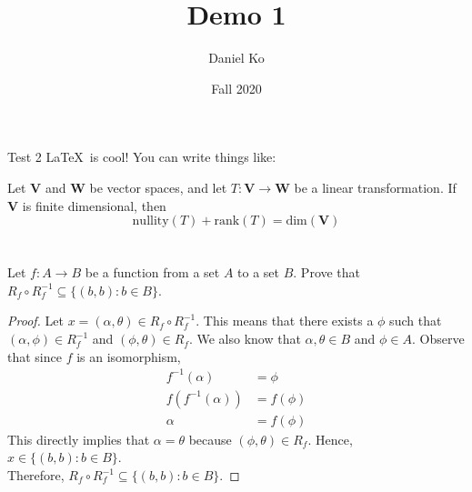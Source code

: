\documentclass[11pt]{scrartcl}
\title{Demo 1}
\author{Daniel Ko}
\date{Fall 2020}
\begin{document}
\maketitle

\section{}
Test 2
\LaTeX \ is cool! You can write things like:
\begin{theorem*}
	Let \textbf{V} and \textbf{W} be vector spaces, and let 
	$T: \mathbf{V} \rightarrow \mathbf{W}$ be a linear transformation.
	If $\mathbf{V}$ is finite dimensional, then
	$$\text{nullity}(T) + \text{rank}(T) = \text{dim}(\mathbf{V})$$
	
\end{theorem*}

\section{}
Let $f: A \rightarrow B$ be a function from a set $A$ to a set $B$. Prove that
$R_{f} \circ R_{f}^{-1} \subseteq\{(b, b): b \in B\}$.

\begin{proof}
	Let $x = (\alpha,\theta) \in R_{f} \circ R_{f}^{-1}$. This means that there exists a $\phi$ such that
	$(\alpha,\phi) \in R_{f}^{-1}$ and $(\phi,\theta) \in R_{f}$. We also know that $\alpha,\theta \in B$ and $\phi \in A$.
	Observe that since $f$ is an isomorphism,
	\begin{align*}
		f^{-1} (\alpha)     & = \phi    \\
		f (f^{-1} (\alpha)) & = f(\phi) \\
		\alpha              & = f(\phi)
	\end{align*}
	This directly implies that $\alpha = \theta$ because $(\phi,\theta) \in R_{f}$. Hence, $x \in \{(b, b): b \in B\}$.\\
	Therefore, $R_{f} \circ R_{f}^{-1} \subseteq\{(b, b): b \in B\}$.
\end{proof}


\end{document}
